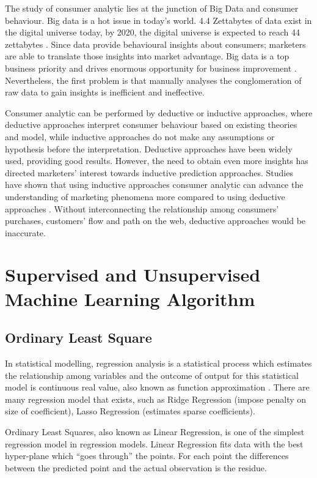 \documentclass[journal]{IEEEtran}
\begin{document}
The study of consumer analytic lies at the junction of Big Data and consumer behaviour. Big data is a hot issue in today’s world. 4.4 Zettabytes of data exist in the digital universe today, by 2020, the digital universe is expected to reach 44 zettabytes \cite{Idc2014-ey}. Since data provide behavioural insights about consumers; marketers are able to translate those insights into market advantage. Big data is a top business priority and drives enormous opportunity for business improvement \cite{Kennedy2011-dt}. Nevertheless, the first problem is that manually analyses the conglomeration of raw data to gain insights is inefficient and ineffective.

Consumer analytic can be performed by deductive or inductive approaches, where deductive approaches interpret consumer behaviour based on existing theories and model, while inductive approaches do not make any assumptions or hypothesis before the interpretation. Deductive approaches have been widely used, providing good results. However, the need to obtain even more insights has directed marketers’ interest towards inductive prediction approaches. Studies have shown that using inductive approaches consumer analytic can advance the understanding of marketing phenomena more compared to using deductive approaches \cite{Erevelles2016-oa}. Without interconnecting the relationship among consumers’ purchases, customers’ flow and path on the web, deductive approaches would be inaccurate.

\section{Supervised and Unsupervised Machine Learning Algorithm}
\subsection{Ordinary Least Square}
In statistical modelling, regression analysis is a statistical process which estimates the relationship among variables and the outcome of output for this statistical model is continuous real value, also known as function approximation \cite{Pedregosa2011-ac}. There are many regression model that exists, such as Ridge Regression (impose penalty on size of coefficient), Lasso Regression (estimates sparse coefficients).

Ordinary Least Squares, also known as Linear Regression, is one of the simplest regression model in regression models. Linear Regression fits data with the best hyper-plane which “goes through” the points. For each point the differences between the predicted point and the actual observation is the residue.
\end{document}
